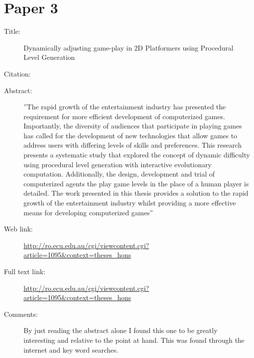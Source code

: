 \documentclass{scrartcl}
\begin{document}
	\section*{Paper 3}
	\begin{description}
		\item[Title:] Dynamically adjusting game-play in 2D Platformers using
		Procedural Level Generation
		\item[Citation:] \cite{dynamic}
		\item[Abstract:] ''The rapid growth of the entertainment industry has presented the requirement for more efficient
		development of computerized games. Importantly, the diversity of audiences that participate in
		playing games has called for the development of new technologies that allow games to address
		users with differing levels of skills and preferences. This research presents a systematic study that
		explored the concept of dynamic difficulty using procedural level generation with interactive
		evolutionary computation. Additionally, the design, development and trial of computerized agents
		the play game levels in the place of a human player is detailed. The work presented in this thesis
		provides a solution to the rapid growth of the entertainment industry whilst providing a more
		effective means for developing computerized games''
		\item[Web link:] \url{http://ro.ecu.edu.au/cgi/viewcontent.cgi?article=1095&context=theses_hons}
		\item[Full text link:] \url{http://ro.ecu.edu.au/cgi/viewcontent.cgi?article=1095&context=theses_hons}
		\item[Comments:] By just reading the abstract alone I found this one to be greatly interesting and relative to the point at hand. This was found through the internet and key word searches.
	\end{description}
	
\end{document}
